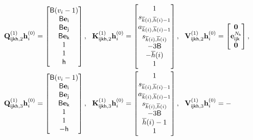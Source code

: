 \begin{align*}
&\bQ^{(1)}_{\si\sj\sk\sh,2}\bh^{(0)}_{i}=
\begin{bmatrix}
\tfthres(\oddeven_i-1)\\
        \tfthres\be_\si\\
         \tfthres\be_\sj\\
          \tfthres\be_\sk\\
          1\\
          1\\
         \sh
    \end{bmatrix},~~ \bK^{(1)}_{\si\sj\sk\sh,2}\bh^{(0)}_{i}=\begin{bmatrix}1\\
     \state_{\bar{k}(i),\bar{h}(i)-1}\\
        \action_{\bar{k}(i),\bar{h}(i)-1}\\
         \state_{\bar{k}(i),\bar{h}(i)}\\
        -3\tfthres\\
     - \bar{h}(i)\\
        1
\end{bmatrix},~~ \bV^{(1)}_{\si\sj\sk\sh,2}\bh^{(0)}_{i}=
\begin{bmatrix}
\bzero\\\be^{\Numvi_\sh}_{\si\sj\sk}
\\\bzero\end{bmatrix},
\\
&\bQ^{(1)}_{\si\sj\sk\sh,3}\bh^{(0)}_{i}=
\begin{bmatrix}
\tfthres(\oddeven_i-1)\\
        \tfthres\be_\si\\
         \tfthres\be_\sj\\
          \tfthres\be_\sk\\
          1\\
          1\\
         -\sh
    \end{bmatrix},~~ \bK^{(1)}_{\si\sj\sk\sh,3}\bh^{(0)}_{i}=\begin{bmatrix}1\\
     \state_{\bar{k}(i),\bar{h}(i)-1}\\
        \action_{\bar{k}(i),\bar{h}(i)-1}\\
         \state_{\bar{k}(i),\bar{h}(i)}\\
        -3\tfthres\\
      \bar{h}(i)-1\\
        1
\end{bmatrix},~~ \bV^{(1)}_{\si\sj\sk\sh,3}\bh^{(0)}_{i}=-

\end{align*}
